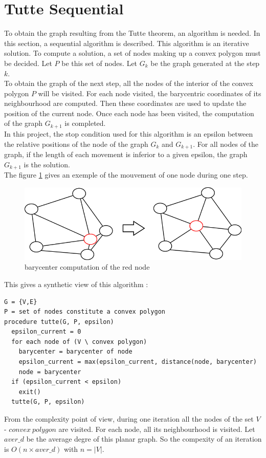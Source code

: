\section{Tutte Sequential}

To obtain the graph resulting from the Tutte theorem, an algorithm is
needed. In this section, a sequential algorithm is described. This
algorithm is an iterative solution. To compute a solution, a set of nodes
 making up a convex polygon must be decided. Let $P$ be this set of nodes. Let
$G_k$ be the graph generated at the step $k$.
\\

To obtain the graph of the next step, all the nodes of the interior of the
convex polygon $P$ will be visited. For each node visited, the barycentric
coordinates of its neighbourhood are computed. Then these coordinates are used
to update the position of the current node. Once each node has been visited,
the computation of the graph $G_{k+1}$ is completed.
\\
In this project, the stop condition used for this algorithm is an epsilon
between the relative positions of the node of the graph $G_k$ and
$G_{k+1}$. For all nodes of the graph, if the length of each movement is
inferior to a given epsilon, the graph $G_{k+1}$ is the solution.
\\

The figure \ref{transition} gives an exemple of the mouvement of one node
during one step.
\begin{figure}[!h]
\centering
\includegraphics[scale=0.5]{img/transition.png}
\caption{barycenter computation of the red node}
\label{transition}
\end{figure}

This gives a synthetic view of this algorithm : 
\begin{verbatim}
G = {V,E}
P = set of nodes constitute a convex polygon
procedure tutte(G, P, epsilon)
  epsilon_current = 0
  for each node of (V \ convex polygon)
    barycenter = barycenter of node
    epsilon_current = max(epsilon_current, distance(node, barycenter)
    node = barycenter
  if (epsilon_current < epsilon)
    exit()
  tutte(G, P, epsilon)
\end{verbatim}

From the complexity point of view, during one iteration all the nodes of
the set $V$ - $convex~polygon$ are visited. For each node, all its
neighbourhood is visited. Let $aver\_d$ be the average degre of this planar
graph. So the compexity of an iteration is $\mathit{O(n \times aver\_d)}$
with $n = |V|$.

